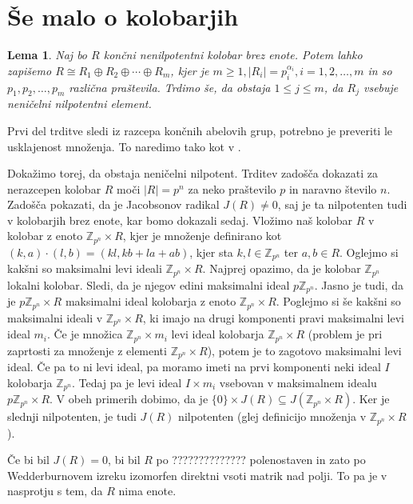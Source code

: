 \documentclass[a4paper, 12pt]{amsart}
\theoremstyle{definition} %
\theoremstyle{plain} %
\newtheorem{lema}[definicija]{Lema}
\newcommand{\Z}{\mathbb Z}
\begin{document}
\section{Še malo o kolobarjih}

\begin{lema}
\label{nilpotent}
Naj bo $R$ končni nenilpotentni kolobar brez enote. Potem lahko zapišemo $R\cong R_1 \oplus R_2 \oplus \cdots \oplus R_m$, kjer je $m \ge 1, |R_i| = p_i^{\alpha_i}, i=1, 2, \dots, m$ in so $p_1,p_2,\dots,p_m$ različna praštevila. Trdimo še, da obstaja $1 \le j \le m$, da $R_j$ vsebuje neničelni nilpotentni element.
\end{lema}

\proof
Prvi del trditve sledi iz razcepa končnih abelovih grup, potrebno je preveriti le usklajenost množenja. To naredimo tako kot v  \cite[Lema 2.3]{diploma}. 

Dokažimo torej, da obstaja neničelni nilpotent. Trditev zadošča dokazati za nerazcepen kolobar $R$ moči $|R|=p^n$ za neko praštevilo $p$ in naravno število $n$. Zadošča pokazati, da je Jacobsonov radikal $J(R)\neq 0$, saj je ta nilpotenten tudi v kolobarjih brez enote, kar bomo dokazali sedaj. Vložimo naš kolobar $R$ v kolobar z enoto $\Z_{p^n} \times R$, kjer je množenje definirano kot $(k,a)\cdot (l,b) = (kl,kb+la+ab)$, kjer sta $k,l\in \Z_{p^n}$ ter $a,b\in R$. Oglejmo si kakšni so maksimalni levi ideali $\Z_{p^n} \times R$. Najprej opazimo, da je kolobar $\Z_{p^n}$ lokalni kolobar. Sledi, da je njegov edini maksimalni ideal $p\Z_{p^n}$. Jasno je tudi, da je $p\Z_{p^n}\times R$ maksimalni ideal kolobarja z enoto $\Z_{p^n} \times R$. 
Poglejmo si še kakšni so maksimalni ideali v $\Z_{p^n} \times R$, ki imajo na drugi komponenti pravi maksimalni levi ideal $m_i$. Če je množica $\Z_{p^n} \times m_i$ levi ideal kolobarja $\Z_{p^n} \times R$ (problem je pri zaprtosti za množenje z elementi $\Z_{p^n} \times R$), potem je to zagotovo maksimalni levi ideal. Če pa to ni levi ideal, pa moramo imeti na prvi komponenti neki ideal $I$ kolobarja $\Z_{p^n}$. Tedaj pa je levi ideal $I\times m_i$ vsebovan v maksimalnem idealu $p\Z_{p^n} \times R$. V obeh primerih dobimo, da je $\{0\}\times J(R) \subseteq J(\Z_{p^n}\times R)$. Ker je slednji nilpotenten, je tudi $J(R)$ nilpotenten (glej definicijo množenja v $\Z_{p^n}\times R$).

Če bi bil $J(R) = 0$, bi bil $R$ po  ?????????????? polenostaven in zato po Wedderburnovem izreku izomorfen direktni vsoti matrik nad polji. To pa je v nasprotju s tem, da $R$ nima enote.
\endproof		
\end{document}

